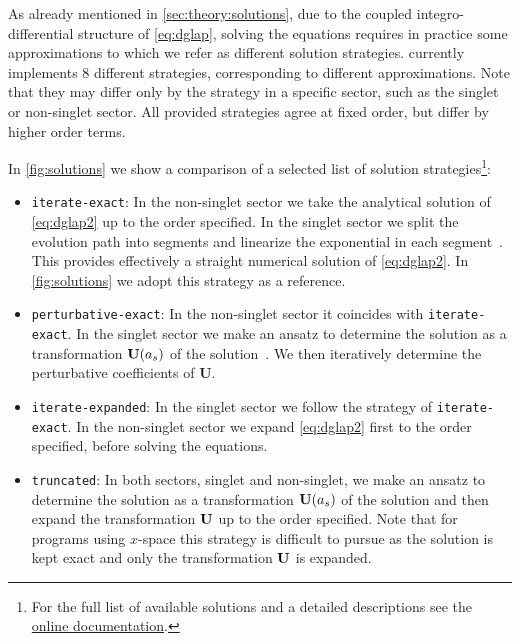As already mentioned in \cref{sec:theory:solutions}, due to
the coupled integro-differential structure of \cref{eq:dglap}, 
solving the equations requires in practice some approximations to which we refer as different
solution strategies. \eko{} currently implements 8 different strategies,
corresponding to different approximations.
Note that they may differ only by the strategy in a specific sector,
such as the singlet or non-singlet sector. All provided strategies
agree at fixed order, but differ by higher order terms.

In \cref{fig:solutions} we show a comparison of a selected list of
solution strategies\footnote{For the full list of available solutions and a
detailed descriptions see the
\href{https://eko.readthedocs.io/en/latest}{online documentation}.}:

\begin{itemize}
    \item \texttt{iterate-exact}:
        In the non-singlet sector we take the analytical solution
        of \cref{eq:dglap2} up to the order specified.
        In the singlet sector we split the evolution path into segments
        and linearize the exponential in each segment~\cite{Bonvini:2012sh}.
        This provides effectively a straight numerical solution of \cref{eq:dglap2}.
        In \cref{fig:solutions} we adopt this strategy as a reference.
    \item \texttt{perturbative-exact}:
        In the non-singlet sector it coincides with \texttt{iterate-exact}.
        In the singlet sector we make an ansatz to determine the solution as a
        transformation $\vb{U}(a_s)$ of the \lo{} solution~\cite{Vogt:2004ns}. We then
        iteratively determine the perturbative coefficients of $\textbf{U}$.
    \item \texttt{iterate-expanded}:
        In the singlet sector we follow the strategy of \texttt{iterate-exact}.
        In the non-singlet sector we expand \cref{eq:dglap2} first to the order
        specified, before solving the equations.
    \item \texttt{truncated}: 
        In both sectors, singlet and non-singlet, we make an ansatz to determine the solution as a
        transformation $\vb{U}(a_s)$ of the \lo{} solution and
        then expand the transformation $\vb U$ up to the order specified.
        Note that for programs using $x$-space this strategy is difficult
        to pursue as the \lo{} solution is kept exact and only the transformation
        $\vb U$ is expanded.
\end{itemize}

